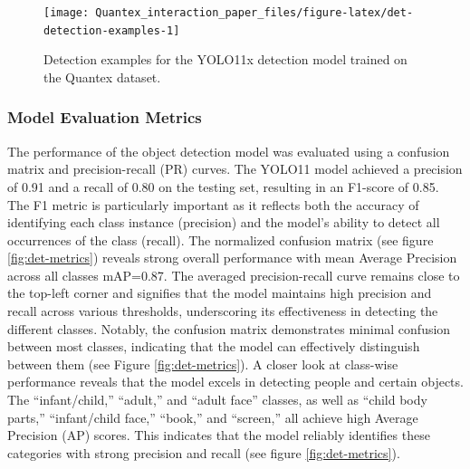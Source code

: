 \documentclass[
  man,floatsintext]{apa6}
\begin{document}
\begin{figure}

{\centering \texttt{[image: Quantex\_interaction\_paper\_files/figure-latex/det-detection-examples-1]} 

}

\caption{Detection examples for the YOLO11x detection model trained on the Quantex dataset.}\label{fig:det-detection-examples}
\end{figure}

\subsubsection{Model Evaluation Metrics}\label{model-evaluation-metrics}

The performance of the object detection model was evaluated using a confusion matrix and precision-recall (PR) curves. The YOLO11 model achieved a precision of 0.91 and a recall of 0.80 on the testing set, resulting in an F1-score of 0.85. The F1 metric is particularly important as it reflects both the accuracy of identifying each class instance (precision) and the model's ability to detect all occurrences of the class (recall). The normalized confusion matrix (see figure \ref{fig:det-metrics}) reveals strong overall performance with mean Average Precision across all classes mAP=0.87. The averaged precision-recall curve remains close to the top-left corner and signifies that the model maintains high precision and recall across various thresholds, underscoring its effectiveness in detecting the different classes. Notably, the confusion matrix demonstrates minimal confusion between most classes, indicating that the model can effectively distinguish between them (see Figure \ref{fig:det-metrics}). A closer look at class-wise performance reveals that the model excels in detecting people and certain objects. The ``infant/child,'' ``adult,'' and ``adult face'' classes, as well as ``child body parts,'' ``infant/child face,'' ``book,'' and ``screen,'' all achieve high Average Precision (AP) scores. This indicates that the model reliably identifies these categories with strong precision and recall (see figure \ref{fig:det-metrics}).
\end{document}
